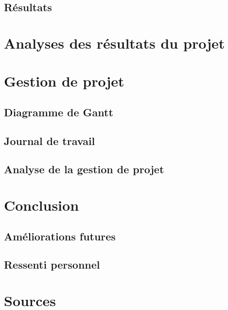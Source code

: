 \documentclass[a4paper,10pt,openany,oneside]{sphinxmanual}
\begin{document}
\section{Résultats}
\label{index:resultats}

\chapter{Analyses des résultats du projet}
\label{index:analyses-des-resultats-du-projet}

\chapter{Gestion de projet}
\label{index:gestion-de-projet}

\section{Diagramme de Gantt}
\label{index:diagramme-de-gantt}

\section{Journal de travail}
\label{index:journal-de-travail}

\section{Analyse de la gestion de projet}
\label{index:analyse-de-la-gestion-de-projet}

\chapter{Conclusion}
\label{index:conclusion}

\section{Améliorations futures}
\label{index:ameliorations-futures}

\section{Ressenti personnel}
\label{index:ressenti-personnel}

\chapter{Sources}
\label{index:sources}
\end{document}
